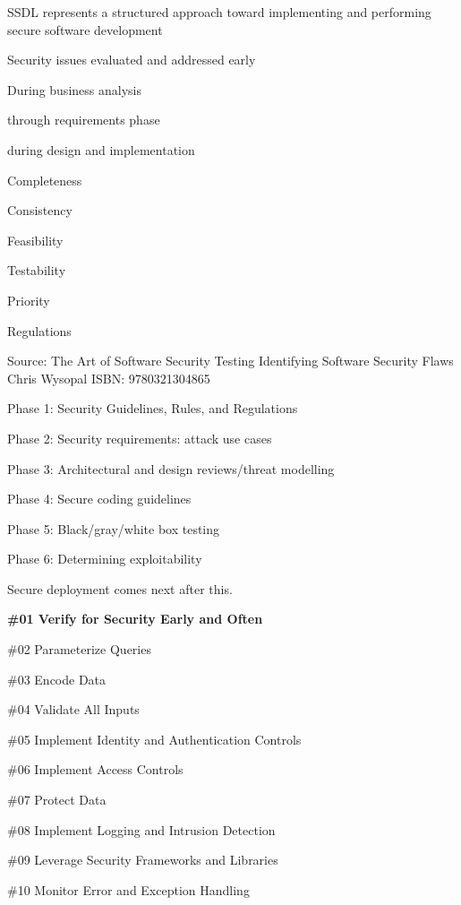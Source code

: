 \documentclass[Screen16to9,17pt]{foils}
\begin{document}
\begin{list2}
\item SSDL represents a structured approach toward implementing and performing secure software development
\item Security issues evaluated and addressed early
\item During business analysis
\item through requirements phase
\item during design and implementation
\end{list2}


\begin{list2}
\item Completeness
\item Consistency
\item Feasibility
\item Testability
\item Priority
\item Regulations
\end{list2}

Source: The Art of Software Security Testing Identifying Software Security Flaws
Chris Wysopal ISBN: 9780321304865


\begin{list2}
\item Phase 1: Security Guidelines, Rules, and Regulations
\item Phase 2: Security requirements: attack use cases
\item Phase 3: Architectural and design reviews/threat modelling
\item Phase 4: Secure coding guidelines
\item Phase 5: Black/gray/white box testing
\item Phase 6: Determining exploitability
\end{list2}

Secure deployment comes next after this.


\begin{list2}
\item {\bf \#01 Verify for Security Early and Often}
\item \#02 Parameterize Queries
\item \#03 Encode Data
\item \#04 Validate All Inputs
\item \#05 Implement Identity and
Authentication Controls
\item \#06 Implement Access Controls
\item \#07 Protect Data
\item \#08 Implement Logging
and Intrusion Detection
\item \#09 Leverage Security
Frameworks and Libraries
\item \#10 Monitor Error and Exception
Handling
\end{list2}
\end{document}
